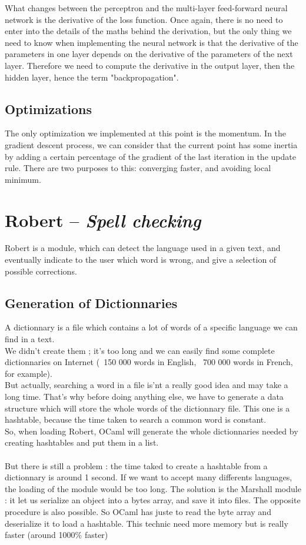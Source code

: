 \documentclass[12pt]{report}
\begin{document}
\begin{center}
\end{center}

What changes between the perceptron and the multi-layer feed-forward neural
network is the derivative of the loss function. Once again, there is no need to
enter into the details of the maths behind the derivation, but the only thing we
need to know when implementing the neural network is that the derivative of the
parameters in one layer depends on the derivative of the parameters of the next
layer. Therefore we need to compute the derivative in the output layer, then the
hidden layer, hence the term "backpropagation".

\section{Optimizations}

The only optimization we implemented at this point is the momentum. In the
gradient descent process, we can consider that the current point has some
inertia by adding a certain percentage of the gradient of the last iteration in
the update rule. There are two purposes to this: converging faster, and avoiding
local minimum.

\chapter{Robert -- \emph{Spell checking}}

Robert is a module, which can detect the language used in a given text, and eventually indicate
to the user which word is wrong, and give a selection of possible corrections.

\section{Generation of Dictionnaries}
A dictionnary is a file which contains a lot of words of a specific language we can find in
a text.\\
We didn't create them ; it's too long and we can easily find some complete dictionnaries on
Internet (~150 000 words in English, ~700 000 words in French, for example).\\
But actually, searching a word in a file is'nt a really good idea and may take a long time.
That's why before doing anything else, we have to generate a data structure which will store
the whole words of the dictionnary file. This one is a hashtable, because the
time taken to search a common word is constant.\\
So, when loading Robert, OCaml will generate the whole dictionnaries needed by creating hashtables
and put them in a list.\\
\\
But there is still a problem : the time taked to create a hashtable from a dictionnary is around 1
second. If we want to accept many differents languages, the loading of the module would be too long.
The solution is the Marshall module : it let us serialize an object into a bytes array, and save it
into files. The opposite procedure is also possible.
So OCaml has juste to read the byte array and deserialize it to load a hashtable. This technic need
more memory but is really faster (around 1000\% faster)
\end{document}
